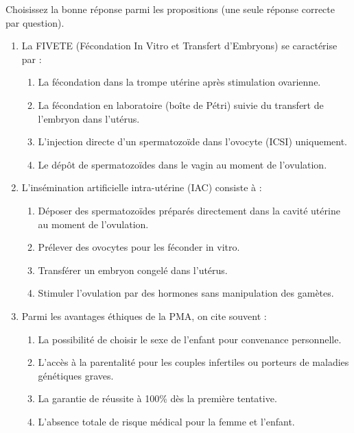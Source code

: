 \documentclass[11pt]{article}
\begin{document}
\begin{exercice}
Choisissez la bonne réponse parmi les propositions (une seule réponse correcte par question).
\begin{enumerate}
    \item La FIVETE (Fécondation In Vitro et Transfert d'Embryons) se caractérise par :
    \begin{enumerate}
        \item La fécondation dans la trompe utérine après stimulation ovarienne.
        \item La fécondation en laboratoire (boîte de Pétri) suivie du transfert de l'embryon dans l'utérus.
        \item L'injection directe d'un spermatozoïde dans l'ovocyte (ICSI) uniquement.
        \item Le dépôt de spermatozoïdes dans le vagin au moment de l'ovulation.
    \end{enumerate}
    
    \item L'insémination artificielle intra-utérine (IAC) consiste à :
    \begin{enumerate}
        \item Déposer des spermatozoïdes préparés directement dans la cavité utérine au moment de l'ovulation.
        \item Prélever des ovocytes pour les féconder in vitro.
        \item Transférer un embryon congelé dans l'utérus.
        \item Stimuler l'ovulation par des hormones sans manipulation des gamètes.
    \end{enumerate}
    
    \item Parmi les avantages éthiques de la PMA, on cite souvent :
    \begin{enumerate}
        \item La possibilité de choisir le sexe de l'enfant pour convenance personnelle.
        \item L'accès à la parentalité pour les couples infertiles ou porteurs de maladies génétiques graves.
        \item La garantie de réussite à 100\% dès la première tentative.
        \item L'absence totale de risque médical pour la femme et l'enfant.
    \end{enumerate}
\end{enumerate}
\end{exercice}
\end{document}
